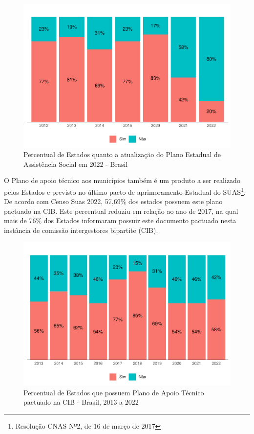 \documentclass[
  brazilian]{report}
\begin{document}
\begin{figure}
\includegraphics{Censo-SUAS-2022_files/figure-latex/PEAS-1} \caption[Percentual de Estados quanto a atualização do Plano Estadual de Assistência Social em 2022 - Brasil]{Percentual de Estados quanto a atualização do Plano Estadual de Assistência Social em 2022 - Brasil}\label{fig:PEAS}
\end{figure}

O Plano de apoio técnico aos municípios também é um produto a ser
realizado pelos Estados e previsto no último pacto de aprimoramento
Estadual do SUAS\footnote{Resolução CNAS Nº2, de 16 de março de 2017}.
De acordo com Censo Suas 2022, 57,69\% dos estados possuem este plano
pactuado na CIB. Este percentual reduziu em relação ao ano de 2017, na
qual mais de 76\% dos Estados informaram possuir este documento pactuado
nesta instância de comissão intergestores bipartite (CIB).

\begin{figure}
\includegraphics{Censo-SUAS-2022_files/figure-latex/plan_apoio_tec-1} \caption[Percentual de Estados que possuem Plano de Apoio Técnico pactuado na CIB - Brasil, 2013 a 2022]{Percentual de Estados que possuem Plano de Apoio Técnico pactuado na CIB - Brasil, 2013 a 2022}\label{fig:plan_apoio_tec}
\end{figure}
\end{document}
